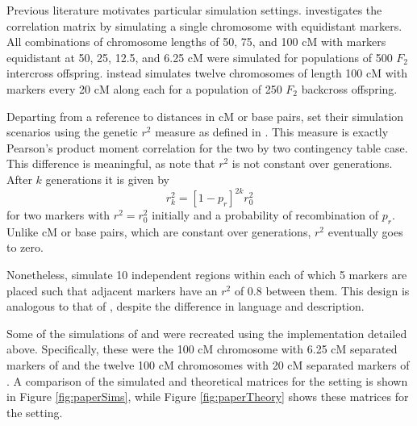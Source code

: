 \documentclass{article}
\begin{document}
Previous literature motivates particular simulation settings. \cite{cheverud2001} investigates the correlation matrix by simulating a single chromosome with equidistant markers. All combinations of chromosome lengths of 50, 75, and 100 cM with markers equidistant at 50, 25, 12.5, and 6.25 cM were simulated for populations of 500 $F_2$ intercross offspring. \cite{LanderBotstein1989} instead simulates twelve chromosomes of length 100 cM with markers every 20 cM along each for a population of 250 $F_2$ backcross offspring.

Departing from a reference to distances in cM or base pairs, \cite{LiJi2005} set their simulation scenarios using the genetic $r^2$ measure as defined in \cite{hillrobertson1968}. This measure is exactly Pearson's product moment correlation for the two by two contingency table case.
This difference is meaningful, as \cite{siegmundyakir2007} note that $r^2$ is not constant over generations. After $k$ generations it is given by
$$r_k^2 = \left [ 1 - p_r \right ]^{2k}  r^2_0$$
for two markers with $r^2 = r^2_0$ initially and a probability of recombination of $p_r$. Unlike cM or base pairs, which are constant over generations, $r^2$ eventually goes to zero.

Nonetheless, \cite{LiJi2005} simulate 10 independent regions within each of which 5 markers are placed such that adjacent markers have an $r^2$ of 0.8 between them. This design is analogous to that of \cite{LanderBotstein1989}, despite the difference in language and description.

Some of the simulations of \cite{cheverud2001} and \cite{LanderBotstein1989} were recreated using the implementation detailed above. Specifically, these were the 100 cM chromosome with 6.25 cM separated markers of \cite{cheverud2001} and the twelve 100 cM chromosomes with 20 cM separated markers of \cite{LanderBotstein1989}. A comparison of the simulated and theoretical matrices for the \cite{cheverud2001} setting is shown in Figure \ref{fig:paperSims}, while Figure \ref{fig:paperTheory} shows these matrices for the \cite{LanderBotstein1989} setting.
\end{document}
